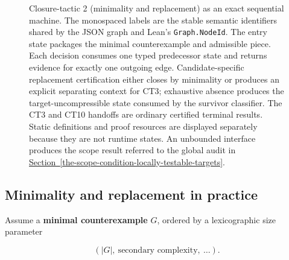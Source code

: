 \documentclass[
  11pt,
]{article}
\theoremstyle{definition}
\newcommand{\secref}[1]{\hyperref[#1]{Section~\ref*{#1}}}
\begin{document}
\begin{figure}[p]
{%
}
\caption[Closure-tactic 2: minimality and replacement]{Closure-tactic 2 (minimality and replacement) as an exact sequential machine.  The monospaced labels are the stable semantic identifiers shared by the JSON graph and Lean's \texttt{Graph.NodeId}.  The entry state packages the minimal counterexample and admissible piece.  Each decision consumes one typed predecessor state and returns evidence for exactly one outgoing edge.  Candidate-specific replacement certification either closes by minimality or produces an explicit separating context for CT3; exhaustive absence produces the target-uncompressible state consumed by the survivor classifier.  The CT3 and CT10 handoffs are ordinary certified terminal results.  Static definitions and proof resources are displayed separately because they are not runtime states.  An unbounded interface produces the scope result referred to the global audit in \secref{the-scope-condition-locally-testable-targets}.}
\label{fig:ct2-minimality-replacement}
\end{figure}
\FloatBarrier

\subsection*{Minimality and replacement in practice}

Assume a \textbf{minimal counterexample} \(G\), ordered by a
lexicographic size parameter

\[
(|G|,\ \text{secondary complexity},\ \ldots).
\]
\end{document}

